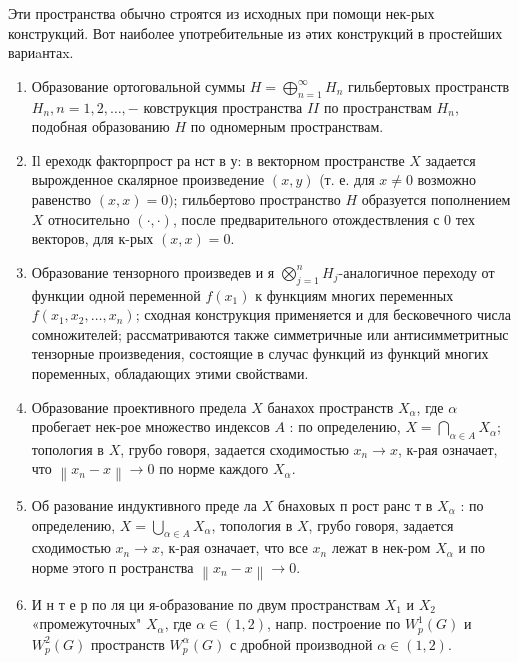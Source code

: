 \documentclass[10pt]{article}
\begin{document}
Эти пространства обычно строятся из исходных при помощи нек-рых конструкций. Вот наиболее употребительные из әтих конструкций в простейших вариaнтаx.



\begin{enumerate}

  \item Образование ортоговальной суммы $H=\bigoplus_{n=1}^{\infty} H_{n}$ гильбертовых пространств $H_{n}, n=1,2, \ldots,-$ ковструкция пространства $I I$ по пространствам $H_{n}$, подобная образованию $H$ по одномерным пространствам.



  \item Il ереходк факторпрост ра нст в у: в векторном пространстве $X$ задается вырожденное скалярное произведение $(x, y)$ (т. е. для $x \neq 0$ возможно равенство $(x, x)=0)$; гильбертово пространство $H$ образуется пополнением $X$ относительно $(\cdot, \cdot)$, после предварительного отождествления с 0 тех векторов, для к-рых $(x, x)=0$.



  \item Образование тензорного произведев и я $\bigotimes_{j=1}^{n} H_{j}$-аналогичное переходу от функции одной переменной $f\left(x_{1}\right)$ к функциям многих переменных $f\left(x_{1}, x_{2}, \ldots, x_{n}\right)$; сходная конструкция применяется и для бесковечного числа сомножителей; рассматриваются также симметричные или антисимметритныс тензорные произведения, состоящие в случас функций из функций многих поременных, обладающих этими свойствами.



  \item Образование проективного предела $X$ банахох пространств $X_{\alpha}$, где $\alpha$ пробегает нек-рое множество индексов $A$ : по определению, $X=\bigcap_{\alpha \in A} X_{\alpha}$; топология в $X$, грубо говоря, задается сходимостью $x_{n} \longrightarrow x$, к-рая означает, что $\left\|x_{n}-x\right\| \longrightarrow 0$ по норме каждого $X_{\alpha}$.



  \item Об разование индуктивного преде ла $X$ бнаховых п рост ранс т в $X_{\alpha}$ : по определению, $X=\bigcup_{\alpha \in A} X_{\alpha}$, топология в $X$, грубо говоря, задается сходимостью $x_{n} \longrightarrow x$, к-рая означает, что все $x_{n}$ лежат в нек-ром $X_{\alpha}$ и по норме этого п ространства $\left\|x_{n}-x\right\| \longrightarrow 0$.



  \item И н т е р по ля ци я-образование по двум пространствам $X_{1}$ и $X_{2}$ «промежуточных" $X_{\alpha}$, где $\alpha \in(1,2)$, напр. построение по $W_{p}^{1}(G)$ и $W_{p}^{2}(G)$ пространств $W_{p}^{\alpha}(G)$ с дробной производной $\alpha \in(1,2)$.



\end{enumerate}
\end{document}
